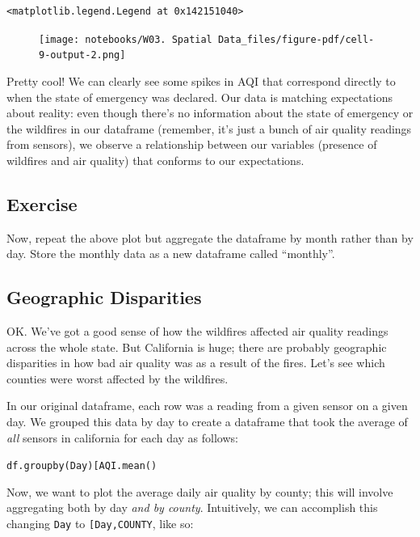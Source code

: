 \documentclass[
  letterpaper,
  DIV=11,
  numbers=noendperiod]{scrreprt}
\begin{document}
\begin{verbatim}
<matplotlib.legend.Legend at 0x142151040>
\end{verbatim}

\begin{figure}[H]

{\centering \texttt{[image: notebooks/W03. Spatial Data\_files/figure-pdf/cell-9-output-2.png]}

}

\end{figure}

Pretty cool! We can clearly see some spikes in AQI that correspond
directly to when the state of emergency was declared. Our data is
matching expectations about reality: even though there's no information
about the state of emergency or the wildfires in our dataframe
(remember, it's just a bunch of air quality readings from sensors), we
observe a relationship between our variables (presence of wildfires and
air quality) that conforms to our expectations.

\hypertarget{exercise-4}{%
\subsection{Exercise}\label{exercise-4}}

Now, repeat the above plot but aggregate the dataframe by month rather
than by day. Store the monthly data as a new dataframe called
``monthly''.

\hypertarget{geographic-disparities}{%
\subsection{Geographic Disparities}\label{geographic-disparities}}

OK. We've got a good sense of how the wildfires affected air quality
readings across the whole state. But California is huge; there are
probably geographic disparities in how bad air quality was as a result
of the fires. Let's see which counties were worst affected by the
wildfires.

In our original dataframe, each row was a reading from a given sensor on
a given day. We grouped this data by day to create a dataframe that took
the average of \emph{all} sensors in california for each day as follows:

\texttt{df.groupby(\textquotesingle{}Day\textquotesingle{}){[}\textquotesingle{}AQI\textquotesingle{}{]}.mean()}

Now, we want to plot the average daily air quality by county; this will
involve aggregating both by day \emph{and by county}. Intuitively, we
can accomplish this changing
\texttt{\textquotesingle{}Day\textquotesingle{}} to
\texttt{{[}\textquotesingle{}Day\textquotesingle{},\textquotesingle{}COUNTY\textquotesingle{}{]}},
like so:
\end{document}
